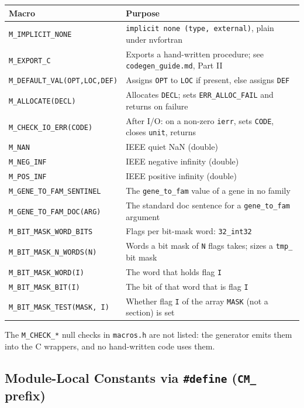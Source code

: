 \documentclass{article}
\begin{document}
\begin{tabular}{ll}
\toprule
Macro & Purpose \\
\midrule
\texttt{M\_IMPLICIT\_NONE} & \texttt{implicit none (type, external)}, plain under nvfortran \\
\texttt{M\_EXPORT\_C} & Exports a hand-written procedure; see \texttt{codegen\_guide.md}, Part II \\
\texttt{M\_DEFAULT\_VAL(OPT,LOC,DEF)} & Assigns \texttt{OPT} to \texttt{LOC} if present, else assigns \texttt{DEF} \\
\texttt{M\_ALLOCATE(DECL)} & Allocates \texttt{DECL}; sets \texttt{ERR\_ALLOC\_FAIL} and returns on failure \\
\texttt{M\_CHECK\_IO\_ERR(CODE)} & After I/O: on a non-zero \texttt{ierr}, sets \texttt{CODE}, closes \texttt{unit}, returns \\
\texttt{M\_NAN} & IEEE quiet NaN (double) \\
\texttt{M\_NEG\_INF} & IEEE negative infinity (double) \\
\texttt{M\_POS\_INF} & IEEE positive infinity (double) \\
\texttt{M\_GENE\_TO\_FAM\_SENTINEL} & The \texttt{gene\_to\_fam} value of a gene in no family \\
\texttt{M\_GENE\_TO\_FAM\_DOC(ARG)} & The standard doc sentence for a \texttt{gene\_to\_fam} argument \\
\texttt{M\_BIT\_MASK\_WORD\_BITS} & Flags per bit-mask word: \texttt{32\_int32} \\
\texttt{M\_BIT\_MASK\_N\_WORDS(N)} & Words a bit mask of \texttt{N} flags takes; sizes a \texttt{tmp\_} bit mask \\
\texttt{M\_BIT\_MASK\_WORD(I)} & The word that holds flag \texttt{I} \\
\texttt{M\_BIT\_MASK\_BIT(I)} & The bit of that word that is flag \texttt{I} \\
\texttt{M\_BIT\_MASK\_TEST(MASK, I)} & Whether flag \texttt{I} of the array \texttt{MASK} (not a section) is set \\
\bottomrule
\end{tabular}

The \texttt{M\_CHECK\_*} null checks in \texttt{macros.h} are not listed: the generator emits them
into the C wrappers, and no hand-written code uses them.

\subsection{Module-Local Constants via \texttt{\#define} (\texttt{CM\_} prefix)}\label{sec:cm-macros}
\end{document}
